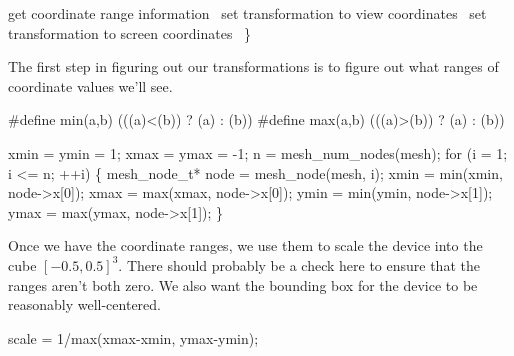     \LA{}get coordinate range information~{\nwtagstyle{}}\RA{}
    \LA{}set transformation to view coordinates~{\nwtagstyle{}}\RA{}
    \LA{}set transformation to screen coordinates~{\nwtagstyle{}}\RA{}
\}

\nwendcode{}\nwdocspar

The first step in figuring out our transformations is to figure out
what ranges of coordinate values we'll see.

\nwenddocs{}\endmoddef\nwstartdeflinemarkup{}\nwenddeflinemarkup
#define min(a,b) (((a)<(b)) ? (a) : (b))
#define max(a,b) (((a)>(b)) ? (a) : (b))

\nwendcode{}\nwdocspar

\nwenddocs{}\endmoddef\nwstartdeflinemarkup{}\nwenddeflinemarkup
xmin = ymin = 1;
xmax = ymax = -1;
n = mesh_num_nodes(mesh);
for (i = 1; i <= n; ++i) \{
    mesh_node_t* node = mesh_node(mesh, i);
    xmin = min(xmin, node->x[0]);
    xmax = max(xmax, node->x[0]);
    ymin = min(ymin, node->x[1]);
    ymax = max(ymax, node->x[1]);
\}

\nwendcode{}\nwdocspar

Once we have the coordinate ranges, we use them to scale the device
into the cube $[-0.5, 0.5]^3$.
There should probably be a check here to ensure
that the ranges aren't both zero.  We also want the bounding box for the
device to be reasonably well-centered.

\nwenddocs{}\endmoddef\nwstartdeflinemarkup{}\nwenddeflinemarkup
scale = 1/max(xmax-xmin, ymax-ymin);

